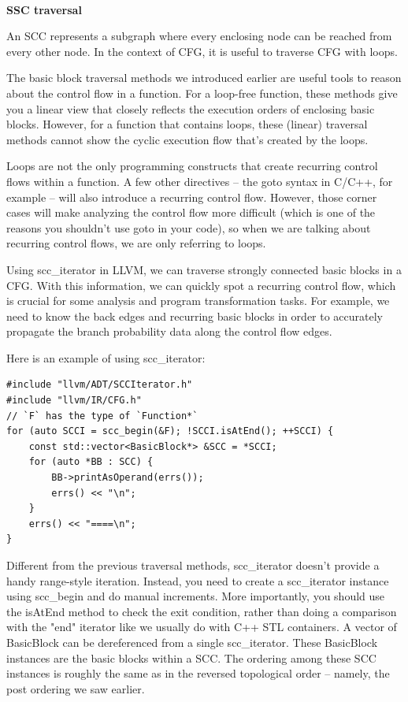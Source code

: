 \hspace*{\fill} \\ %
\noindent
\textbf{SSC traversal}

An SCC represents a subgraph where every enclosing node can be reached from every other node. In the context of CFG, it is useful to traverse CFG with loops.

The basic block traversal methods we introduced earlier are useful tools to reason about the control flow in a function. For a loop-free function, these methods give you a linear view that closely reflects the execution orders of enclosing basic blocks. However, for a function that contains loops, these (linear) traversal methods cannot show the cyclic execution flow that's created by the loops.

\begin{tcolorbox}[colback=blue!5!white,colframe=blue!75!black, fonttitle=\bfseries,title=Recurring control flow]	
\hspace*{0.7cm}Loops are not the only programming constructs that create recurring control flows within a function. A few other directives – the goto syntax in C/C++, for example – will also introduce a recurring control flow. However, those corner cases will make analyzing the control flow more difficult (which is one of the reasons you shouldn't use goto in your code), so when we are talking about recurring control flows, we are only referring to loops.
\end{tcolorbox}

Using scc\_iterator in LLVM, we can traverse strongly connected basic blocks in a CFG. With this information, we can quickly spot a recurring control flow, which is crucial for some analysis and program transformation tasks. For example, we need to know the back edges and recurring basic blocks in order to accurately propagate the branch probability data along the control flow edges.

Here is an example of using scc\_iterator:

\begin{lstlisting}[style=styleCXX]
#include "llvm/ADT/SCCIterator.h"
#include "llvm/IR/CFG.h"
// `F` has the type of `Function*`
for (auto SCCI = scc_begin(&F); !SCCI.isAtEnd(); ++SCCI) {
	const std::vector<BasicBlock*> &SCC = *SCCI;
	for (auto *BB : SCC) {
		BB->printAsOperand(errs());
		errs() << "\n";
	}
	errs() << "====\n";
}
\end{lstlisting}

Different from the previous traversal methods, scc\_iterator doesn't provide a handy range-style iteration. Instead, you need to create a scc\_iterator instance using scc\_begin and do manual increments. More importantly, you should use the isAtEnd method to check the exit condition, rather than doing a comparison with the "end" iterator like we usually do with C++ STL containers. A vector of BasicBlock can be dereferenced from a single scc\_iterator. These BasicBlock instances are the basic blocks within a SCC. The ordering among these SCC instances is roughly the same as in the reversed topological order – namely, the post ordering we saw earlier. 


